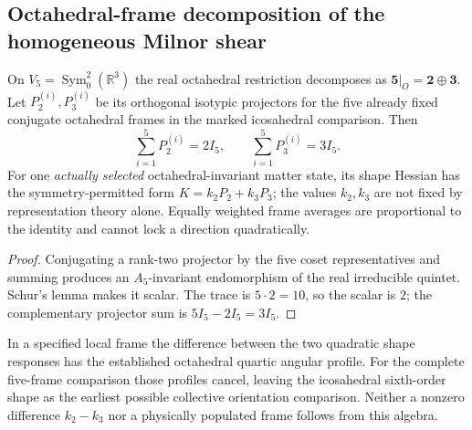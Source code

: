 \documentclass[12pt,a4paper]{article}
\begin{document}
\subsection{Octahedral-frame decomposition of the homogeneous Milnor shear}
\label{bh:berger:v117:p3c:fiveframe-shear}
\begin{proposition}
\label{bh:berger:v117:p3c:projectors}
On $V_5=\operatorname{Sym}^2_0(\mathbb R^3)$ the real octahedral
restriction decomposes as $\mathbf5|_O=\mathbf2\oplus\mathbf3$.
Let $P_2^{(i)},P_3^{(i)}$ be its orthogonal isotypic projectors for
the five already fixed conjugate octahedral frames in the marked
icosahedral comparison. Then
\[
 \sum_{i=1}^5 P_2^{(i)}=2I_5,\qquad
 \sum_{i=1}^5 P_3^{(i)}=3I_5.
\]
For one \emph{actually selected} octahedral-invariant matter state,
its shape Hessian has the symmetry-permitted form
$K=k_2P_2+k_3P_3$; the values $k_2,k_3$ are not fixed by
representation theory alone.  Equally weighted frame averages are
proportional to the identity and cannot lock a direction quadratically.
\end{proposition}
\begin{proof}
Conjugating a rank-two projector by the five coset representatives
and summing produces an $A_5$-invariant endomorphism of the real
irreducible quintet.  Schur's lemma makes it scalar. The trace
is $5\cdot2=10$, so the scalar is $2$; the complementary projector
sum is $5I_5-2I_5=3I_5$.
\end{proof}
\begin{remark}
\label{bh:berger:v117:p3c:source-scope}
In a specified local frame the difference between the two quadratic
shape responses has the established octahedral quartic angular
profile. For the complete five-frame comparison those profiles cancel,
leaving the icosahedral sixth-order shape as the earliest possible
collective orientation comparison.  Neither a nonzero difference
$k_2-k_3$ nor a physically populated frame follows from this algebra.
\end{remark}
\end{document}
